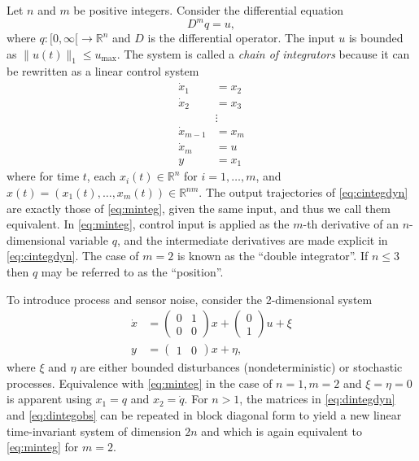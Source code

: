 \documentclass{amsart}
\theoremstyle{definition}
\begin{document}
Let $n$ and $m$ be positive integers.  Consider the differential equation
\begin{equation}\label{eq:minteg}
D^{m}q = u ,
\end{equation}
where $q: [0,\infty [ \rightarrow \mathbb{R}^{n}$ and $D$ is the differential
operator.  The input $u$ is bounded as $\lVert u(t) \rVert_1 \leq
u_{\mathrm{max}}$.  The system is called a \textit{chain of integrators}
because it can be rewritten as a linear control system
\begin{equation}\label{eq:cintegdyn}
\begin{split}
\dot{x}_1 &= x_2 \\
\dot{x}_2 &= x_3 \\
&\vdots \\
\dot{x}_{m-1} &= x_m \\
\dot{x}_m &= u \\
y &= x_1
\end{split}
\end{equation}
where for time $t$, each $x_{i}(t)\in \mathbb{R}^n$ for $i=1,\ldots,m$, and
$x(t)=\left( x_{1}(t) , \ldots , x_{m}(t)\right)\in \mathbb{R}^{nm}$. The output
trajectories of \eqref{eq:cintegdyn} are exactly those of \eqref{eq:minteg},
given the same input, and thus we call them equivalent. In \eqref{eq:minteg},
control input is applied as the $m$-th derivative of an $n$-dimensional variable
$q$, and the intermediate derivatives are made explicit in
\eqref{eq:cintegdyn}. The case of $m=2$ is known as the
``double integrator''. If $n \leq 3$ then $q$ may be referred to as the
``position''.

To introduce process and sensor noise, consider the 2-dimensional system
\begin{align}
\dot{x} &= \left(
\begin{array}{cc}
0 & 1 \\
0 & 0
\end{array}
\right) x + \left(
\begin{array}{c}
0 \\
1
\end{array}
\right) u + \xi \label{eq:dintegdyn}\\
y &= \left(
\begin{array}{cc}
1 & 0
\end{array}
\right) x + \eta \label{eq:dintegobs},
\end{align}
where $\xi$ and $\eta$ are either bounded disturbances (nondeterministic) or
stochastic processes.  Equivalence with \eqref{eq:minteg} in the case of
$n=1, m=2$ and $\xi=\eta=0$ is apparent using $x_1 = q$ and $x_2 = \dot{q}$.  For $n
> 1$, the matrices in \eqref{eq:dintegdyn} and \eqref{eq:dintegobs} can be
repeated in block diagonal form to yield a new linear time-invariant system of
dimension $2n$ and which is again equivalent to \eqref{eq:minteg} for $m=2$.
\end{document}
